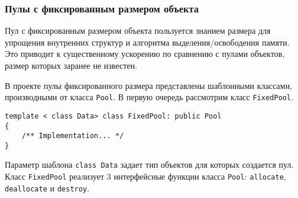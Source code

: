 \documentclass{article}
\begin{document}
\subsubsection{Пулы с фиксированным размером объекта}
Пул с фиксированным размером объекта пользуется знанием размера для упрощения внутренних структур и алгоритма выделения/освободения памяти. Это приводит к существенному ускорению по сравнению с пулами объектов, размер которых заранее не известен.

В проекте пулы фиксированного размера представлены шаблонными классами, производными от класса \lstinline{Pool}. В первую очередь рассмотрим класс \lstinline{FixedPool}.
\begin{lstlisting}
template < class Data> class FixedPool: public Pool
{
    /** Implementation... */
}
\end{lstlisting}
Параметр шаблона \lstinline{class Data} задает тип объектов для которых создается пул. Класс \lstinline{FixedPool} реализует 3 интерфейсные функции класса \lstinline{Pool}: \lstinline{allocate}, \lstinline{deallocate} и \lstinline{destroy}.
\end{document}

